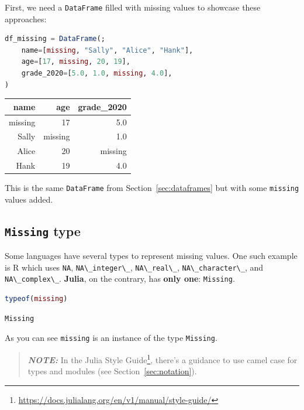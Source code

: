 \documentclass[
  notoc %
]{tufte-book}
\DeclareRobustCommand{\href}[2]{#2\footnote{\url{#1}}}
\newcommand{\passthrough}[1]{#1}
\begin{document}
First, we need a \passthrough{\lstinline!DataFrame!} filled with missing
values to showcase these approaches:

\begin{lstlisting}[language=Julia]
df_missing = DataFrame(;
    name=[missing, "Sally", "Alice", "Hank"],
    age=[17, missing, 20, 19],
    grade_2020=[5.0, 1.0, missing, 4.0],
)
\end{lstlisting}

\begin{longtable}[]{@{}rrr@{}}
\toprule()
name & age & grade\_2020 \\
\midrule()
\endhead
missing & 17 & 5.0 \\
Sally & missing & 1.0 \\
Alice & 20 & missing \\
Hank & 19 & 4.0 \\
\bottomrule()
\end{longtable}

This is the same \passthrough{\lstinline!DataFrame!} from
Section~\ref{sec:dataframes} but with some
\passthrough{\lstinline!missing!} values added.

\hypertarget{sec:missing_type}{%
\subsection{\texorpdfstring{\texttt{Missing}
type}{Missing type}}\label{sec:missing_type}}

Some languages have several types to represent missing values. One such
example is R which uses \passthrough{\lstinline!NA!},
\passthrough{\lstinline!NA\_integer\_!},
\passthrough{\lstinline!NA\_real\_!},
\passthrough{\lstinline!NA\_character\_!}, and
\passthrough{\lstinline!NA\_complex\_!}. \textbf{Julia}, on the
contrary, has \textbf{only one}: \passthrough{\lstinline!Missing!}.

\begin{lstlisting}[language=Julia]
typeof(missing)
\end{lstlisting}

\begin{lstlisting}[language=Output]
Missing
\end{lstlisting}

As you can see \passthrough{\lstinline!missing!} is an instance of the
type \passthrough{\lstinline!Missing!}.

\begin{quote}
\textbf{\emph{NOTE:}} In the
\href{https://docs.julialang.org/en/v1/manual/style-guide/}{Julia Style
Guide}, there's a guidance to use camel case for types and modules (see
Section~\ref{sec:notation}).
\end{quote}
\end{document}
